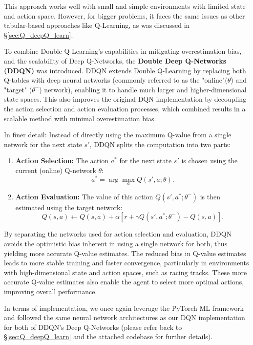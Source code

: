 \documentclass{article}
\begin{document}
This approach works well with small and simple environments with limited state and action space.
However, for bigger problems, it faces the same issues as other tabular-based approaches like Q-Learning, as was discussed in \S \ref{sec:Q_deepQ_learn}.

To combine Double Q-Learning's capabilities in mitigating overestimation bias, and the scalability of Deep Q-Networks, the \textbf{Double Deep Q-Networks (DDQN)} \cite{van2016deep} was introduced.
DDQN extends Double Q-Learning by replacing both Q-tables with deep neural networks (commonly referred to as the "online"($\theta$) and "target" ($\theta^-$) network), enabling it to handle much larger and higher-dimensional state spaces. This also improves the original DQN implementation by decoupling the action selection and action evaluation processes, which combined results in a scalable method with minimal overestimation bias.


In finer detail: Instead of directly using the maximum Q-value from a single network for the next state \( s' \), DDQN splits the computation into two parts:
\begin{enumerate}
    \item \textbf{Action Selection:} The action \( a^* \) for the next state \( s' \) is chosen using the current (online) Q-network $\theta$:
    \[
    a^* = \arg\max_{a} Q(s', a; \theta).
    \]
    \item \textbf{Action Evaluation:} The value of this action \( Q(s', a^*; \theta^-) \) is then estimated using the target network:
    \[
    Q(s, a) \leftarrow Q(s, a) + \alpha \left[ r + \gamma Q(s', a^*; \theta^-) - Q(s, a) \right].
    \]
\end{enumerate}

By separating the networks used for action selection and evaluation, DDQN avoids the optimistic bias inherent in using a single network for both, thus yielding more accurate Q-value estimates. The reduced bias in Q-value estimates leads to more stable training and faster convergence, particularly in environments with high-dimensional state and action spaces, such as racing tracks. These more accurate Q-value estimates also enable the agent to select more optimal actions, improving overall performance.

In terms of implementation, we once again leverage the PyTorch ML framework and followed the same neural network architectures as our DQN implementation for both of DDQN's Deep Q-Networks (please refer back to \S \ref{sec:Q_deepQ_learn} and the attached codebase for further details).
\end{document}
